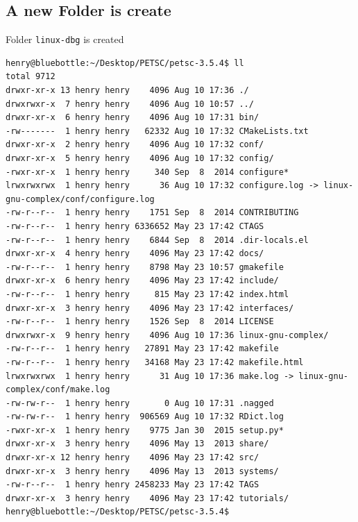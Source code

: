 \documentclass{article}
\begin{document}
\subsection{A new Folder is create} Folder \verb+linux-dbg+ is created
\scriptsize
\begin{verbatim}
henry@bluebottle:~/Desktop/PETSC/petsc-3.5.4$ ll
total 9712
drwxr-xr-x 13 henry henry    4096 Aug 10 17:36 ./
drwxrwxr-x  7 henry henry    4096 Aug 10 10:57 ../
drwxr-xr-x  6 henry henry    4096 Aug 10 17:31 bin/
-rw-------  1 henry henry   62332 Aug 10 17:32 CMakeLists.txt
drwxr-xr-x  2 henry henry    4096 Aug 10 17:32 conf/
drwxr-xr-x  5 henry henry    4096 Aug 10 17:32 config/
-rwxr-xr-x  1 henry henry     340 Sep  8  2014 configure*
lrwxrwxrwx  1 henry henry      36 Aug 10 17:32 configure.log -> linux-gnu-complex/conf/configure.log
-rw-r--r--  1 henry henry    1751 Sep  8  2014 CONTRIBUTING
-rw-r--r--  1 henry henry 6336652 May 23 17:42 CTAGS
-rw-r--r--  1 henry henry    6844 Sep  8  2014 .dir-locals.el
drwxr-xr-x  4 henry henry    4096 May 23 17:42 docs/
-rw-r--r--  1 henry henry    8798 May 23 10:57 gmakefile
drwxr-xr-x  6 henry henry    4096 May 23 17:42 include/
-rw-r--r--  1 henry henry     815 May 23 17:42 index.html
drwxr-xr-x  3 henry henry    4096 May 23 17:42 interfaces/
-rw-r--r--  1 henry henry    1526 Sep  8  2014 LICENSE
drwxrwxr-x  9 henry henry    4096 Aug 10 17:36 linux-gnu-complex/
-rw-r--r--  1 henry henry   27891 May 23 17:42 makefile
-rw-r--r--  1 henry henry   34168 May 23 17:42 makefile.html
lrwxrwxrwx  1 henry henry      31 Aug 10 17:36 make.log -> linux-gnu-complex/conf/make.log
-rw-rw-r--  1 henry henry       0 Aug 10 17:31 .nagged
-rw-rw-r--  1 henry henry  906569 Aug 10 17:32 RDict.log
-rwxr-xr-x  1 henry henry    9775 Jan 30  2015 setup.py*
drwxr-xr-x  3 henry henry    4096 May 13  2013 share/
drwxr-xr-x 12 henry henry    4096 May 23 17:42 src/
drwxr-xr-x  3 henry henry    4096 May 13  2013 systems/
-rw-r--r--  1 henry henry 2458233 May 23 17:42 TAGS
drwxr-xr-x  3 henry henry    4096 May 23 17:42 tutorials/
henry@bluebottle:~/Desktop/PETSC/petsc-3.5.4$ 
\end{verbatim}
\normalsize
\end{document}
